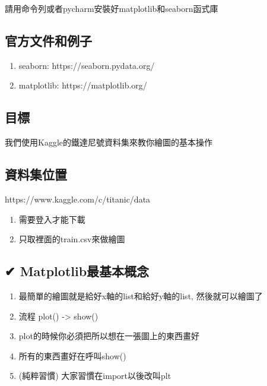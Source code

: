\documentclass[11pt]{ctexart}
\providecommand{\tightlist}{%
      \setlength{\itemsep}{0pt}\setlength{\parskip}{0pt}}
\begin{document}
請用命令列或者pycharm安裝好matplotlib和seaborn函式庫

\hypertarget{ux5b98ux65b9ux6587ux4ef6ux548cux4f8bux5b50}{%
\subsection{官方文件和例子}\label{ux5b98ux65b9ux6587ux4ef6ux548cux4f8bux5b50}}

\begin{enumerate}
\def\labelenumi{\arabic{enumi}.}
\tightlist
\item
  seaborn: https://seaborn.pydata.org/
\item
  matplotlib: https://matplotlib.org/
\end{enumerate}

\hypertarget{ux76eeux6a19}{%
\subsection{目標}\label{ux76eeux6a19}}

我們使用Kaggle的鐵達尼號資料集來教你繪圖的基本操作

\hypertarget{ux8cc7ux6599ux96c6ux4f4dux7f6e}{%
\subsection{資料集位置}\label{ux8cc7ux6599ux96c6ux4f4dux7f6e}}

https://www.kaggle.com/c/titanic/data

\begin{enumerate}
\def\labelenumi{\arabic{enumi}.}
\tightlist
\item
  需要登入才能下載
\item
  只取裡面的train.csv來做繪圖
\end{enumerate}

\hypertarget{matplotlibux6700ux57faux672cux6982ux5ff5}{%
\subsection{✔
Matplotlib最基本概念}\label{matplotlibux6700ux57faux672cux6982ux5ff5}}

\begin{enumerate}
\def\labelenumi{\arabic{enumi}.}
\tightlist
\item
  最簡單的繪圖就是給好x軸的list和給好y軸的list, 然後就可以繪圖了
\item
  流程 plot() -\textgreater{} show()
\item
  plot的時候你必須把所以想在一張圖上的東西畫好
\item
  所有的東西畫好在呼叫show()
\item
  (純粹習慣) 大家習慣在import以後改叫plt
\end{enumerate}
\end{document}
